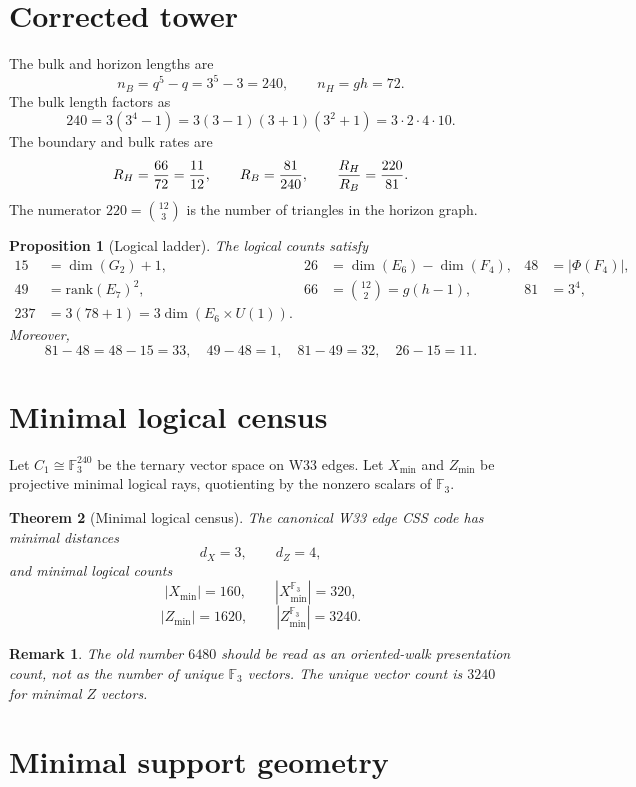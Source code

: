 \documentclass[12pt]{article}
\newtheorem{theorem}{Theorem}[section]
\newtheorem{proposition}[theorem]{Proposition}
\newtheorem*{remark}{Remark}
\newcommand{\F}{\mathbb F}
\newcommand{\rank}{\mathrm{rank}}
\newcommand{\Xmin}{X_{\min}}
\newcommand{\Zmin}{Z_{\min}}
\newcommand{\Roots}{\Phi}
\begin{document}
\section{Corrected tower}

The bulk and horizon lengths are
\[
        n_B=q^5-q=3^5-3=240,
        \qquad
        n_H=gh=72.
\]
The bulk length factors as
\[
        240=3(3^4-1)=3(3-1)(3+1)(3^2+1)=3\cdot2\cdot4\cdot10.
\]
The boundary and bulk rates are
\[
        R_H={66\over72}={11\over12},\qquad R_B={81\over240},\qquad {R_H\over R_B}={220\over81}.
\]
The numerator $220={12\choose3}$ is the number of triangles in the horizon graph.

\begin{proposition}[Logical ladder]
The logical counts satisfy
\begin{align*}
15&=\dim(G_2)+1, & 26&=\dim(E_6)-\dim(F_4), & 48&=|\Roots(F_4)|,\\
49&=\rank(E_7)^2, & 66&={12\choose2}=g(h-1), & 81&=3^4,\\
237&=3(78+1)=3\dim(E_6\times U(1)).
\end{align*}
Moreover,
\[
81-48=48-15=33,
\quad
49-48=1,
\quad
81-49=32,
\quad
26-15=11.
\]
\end{proposition}

\section{Minimal logical census}

Let $C_1\cong\F_3^{240}$ be the ternary vector space on W33 edges.  Let $\Xmin$ and $\Zmin$ be projective minimal logical rays, quotienting by the nonzero scalars of $\F_3$.

\begin{theorem}[Minimal logical census]
The canonical W33 edge CSS code has minimal distances
\[
        d_X=3,\qquad d_Z=4,
\]
and minimal logical counts
\[
        |\Xmin|=160,
        \qquad
        |\Xmin^{\F_3}|=320,
\]
\[
        |\Zmin|=1620,
        \qquad
        |\Zmin^{\F_3}|=3240.
\]
\end{theorem}

\begin{remark}
The old number $6480$ should be read as an oriented-walk presentation count, not as the number of unique $\F_3$ vectors.  The unique vector count is $3240$ for minimal $Z$ vectors.
\end{remark}

\section{Minimal support geometry}
\end{document}
